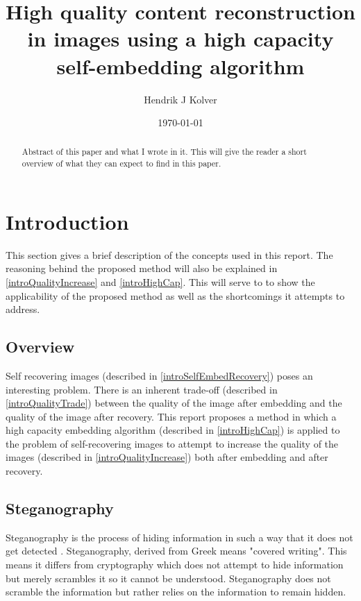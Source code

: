 \documentclass[12pt]{article}
\title{High quality content reconstruction in images using a high capacity self-embedding algorithm}
\author{Hendrik J Kolver}
\date{\today}
\begin{document}
\maketitle

\begin{abstract}

\noindent Abstract of this paper and what I wrote in it.
This will give the reader a short overview of what they can expect to find in this paper.

\end{abstract}

\tableofcontents

\section{Introduction}
This section gives a brief description of the concepts used in this report.
The reasoning behind the proposed method will also be explained in \ref{introQualityIncrease} and \ref{introHighCap}.
This will serve to to show the applicability of the proposed method as well as the shortcomings it attempts to address. 

\subsection{Overview}
Self recovering images (described in \ref{introSelfEmbedRecovery}) poses an interesting problem.
There is an inherent trade-off (described in \ref{introQualityTrade}) between the quality of the image after embedding and the quality of the image after recovery.
This report proposes a method in which a high capacity embedding algorithm (described in \ref{introHighCap}) is applied to the problem of self-recovering images to attempt to increase the quality of the images (described in \ref{introQualityIncrease}) both after embedding and after recovery.


\subsection{Steganography}
\label{introSteganography}
Steganography is the process of hiding information in such a way that it does not get detected \cite{johnson1998exploring}.
Steganography, derived from Greek means "covered writing".
This means it differs from cryptography which does not attempt to hide information but merely scrambles it so it cannot be understood.
Steganography does not scramble the information but rather relies on the information to remain hidden. 
\end{document}
